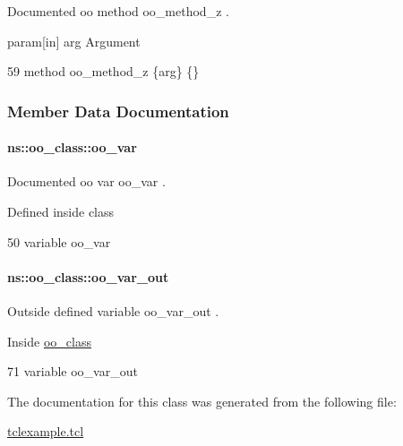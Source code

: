 Documented oo method {\ttfamily oo\+\_\+method\+\_\+z} . 

param\mbox{[}in\mbox{]} arg Argument 
\begin{DoxyCode}
59     \textcolor{keyword}{method} oo\_method\_z \{arg\} \{\}
\end{DoxyCode}


\subsubsection{Member Data Documentation}
\paragraph[{\texorpdfstring{oo\+\_\+var}{oo_var}}]{\setlength{\rightskip}{0pt plus 5cm}ns\+::oo\+\_\+class\+::oo\+\_\+var\hspace{0.3cm}{\ttfamily [static]}}\hypertarget{classns_1_1oo__class_a741f11f4a2db3876205658d4a9a279ba}{}\label{classns_1_1oo__class_a741f11f4a2db3876205658d4a9a279ba}


Documented oo var {\ttfamily oo\+\_\+var} . 

Defined inside class 
\begin{DoxyCode}
50     \textcolor{keyword}{variable} oo\_var
\end{DoxyCode}
\paragraph[{\texorpdfstring{oo\+\_\+var\+\_\+out}{oo_var_out}}]{\setlength{\rightskip}{0pt plus 5cm}ns\+::oo\+\_\+class\+::oo\+\_\+var\+\_\+out\hspace{0.3cm}{\ttfamily [static]}}\hypertarget{classns_1_1oo__class_af46293ede16067c38ca2901416cad8ee}{}\label{classns_1_1oo__class_af46293ede16067c38ca2901416cad8ee}


Outside defined variable {\ttfamily oo\+\_\+var\+\_\+out} . 

Inside \hyperlink{classns_1_1oo__class}{oo\+\_\+class} 
\begin{DoxyCode}
71   \textcolor{keyword}{variable} oo\_var\_out
\end{DoxyCode}


The documentation for this class was generated from the following file\+:\begin{DoxyCompactItemize}
\item 
\hyperlink{tclexample_8tcl}{tclexample.\+tcl}\end{DoxyCompactItemize}
